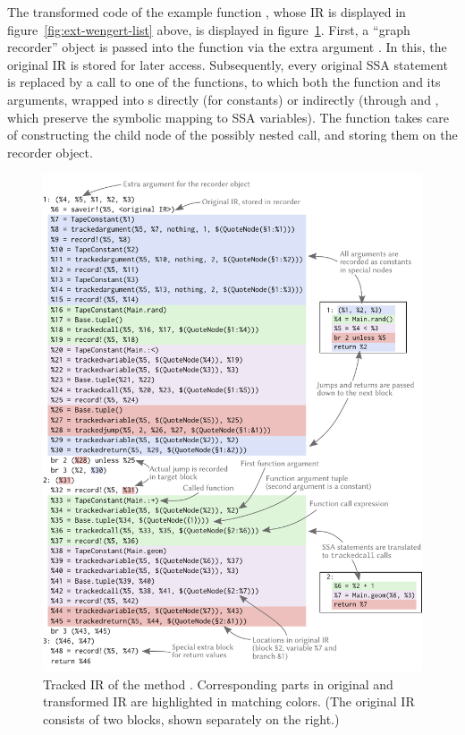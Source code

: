 The transformed code of the example function , whose IR is displayed in
figure~\ref{fig:ext-wengert-list} above, is displayed in figure~\ref{fig:geom-tracked}.  First, a
\enquote{graph recorder} object is passed into the function via the extra argument .  In
this, the original IR is stored for later access.  Subsequently, every original SSA statement is
replaced by a call to one of the \protect{} functions, to which both the function and
its arguments, wrapped into s directly (for constants) or indirectly (through
 and , which preserve the symbolic mapping to SSA
variables).  The   function takes care of constructing the child node of the possibly
nested call, and storing them on the recorder object.

\begin{figure}[p]
  \includegraphics[width=\textwidth]{figures/translation}
  \caption{Tracked IR of the method \protect{}.  Corresponding parts in
    original and transformed IR are highlighted in matching colors.  (The original IR consists of
    two blocks, shown separately on the right.)\label{fig:geom-tracked}}
\end{figure}

